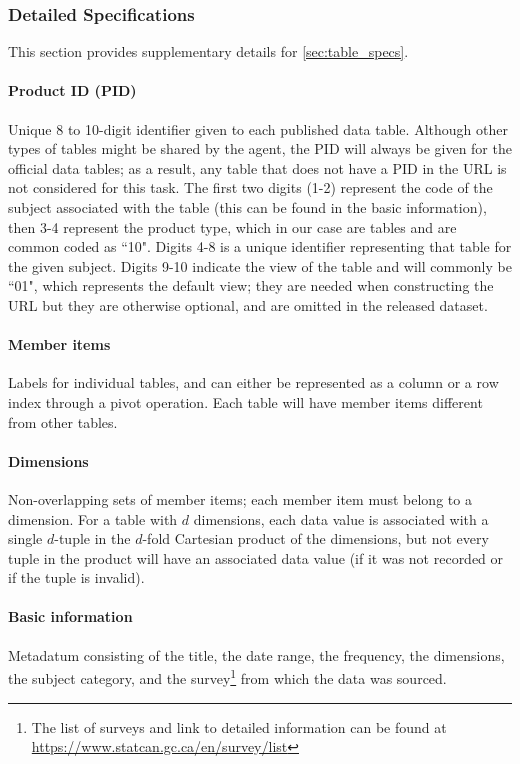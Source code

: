 \documentclass[11pt]{article}
\begin{document}
\subsubsection{Detailed Specifications}
\label{sec:table_specs_supplementary}

This section provides supplementary details for \autoref{sec:table_specs}.

\paragraph{Product ID (PID)} Unique 8 to 10-digit identifier given to each published data table. Although other types of tables might be shared by the agent, the PID will always be given for the official data tables; as a result, any table that does not have a PID in the URL is not considered for this task. The first two digits (1-2) represent the code of the subject associated with the table (this can be found in the basic information), then 3-4 represent the product type, which in our case are tables and are common coded as ``10". Digits 4-8 is a unique identifier representing that table for the given subject. Digits 9-10 indicate the view of the table and will commonly be ``01", which represents the default view; they are needed when constructing the URL but they are otherwise optional, and are omitted in the released dataset.

\paragraph{Member items} Labels for individual tables, and can either be represented as a column or a row index through a pivot operation. Each table will have member items different from other tables.

\paragraph{Dimensions} Non-overlapping sets of member items; each member item must belong to a dimension. For a table with $d$ dimensions, each data value is associated with a single $d$-tuple in the $d$-fold Cartesian product of the dimensions, but not every tuple in the product will have an associated data value (if it was not recorded or if the tuple is invalid).

\paragraph{Basic information} Metadatum consisting of the title, the date range, the frequency, the dimensions, the subject category, and the survey\footnote{ The list of surveys and link to detailed information can be found at \href{https://www.statcan.gc.ca/en/survey/list}{https://www.statcan.gc.ca/en/survey/list} } from which the data was sourced.
\end{document}
